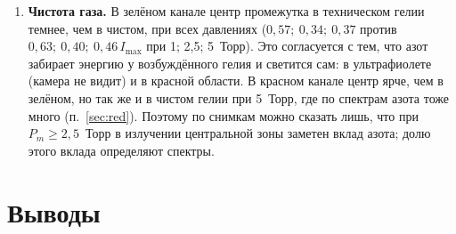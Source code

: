 \documentclass[12pt,a4paper]{article}
\begin{document}
\begin{enumerate}
        (азот, пары воды, см. полосу OH) сдвигают границу в сторону
        молекулярных газов. Это согласуется с тем, что в техническом
        гелии переход наступил раньше (3,5 против 3,9~Торр). Кроме того,
        появление страты --- лишь визуальный признак, и его точная
        связь с $\alpha\to\gamma$ требует измерения тока.
  \item \textbf{Чистота газа.} В зелёном канале центр промежутка в
        техническом гелии темнее, чем в чистом, при всех давлениях
        ($0{,}57;\ 0{,}34;\ 0{,}37$ против $0{,}63;\ 0{,}40;\ 0{,}46\,I_\text{max}$
        при 1; 2,5; 5~Торр). Это согласуется с тем, что азот забирает
        энергию у возбуждённого гелия и светится сам: в ультрафиолете
        (камера не видит) и в красной области. В красном канале центр
        ярче, чем в зелёном, но так же и в чистом гелии при 5~Торр, где по
        спектрам азота тоже много (п.~\ref{sec:red}). Поэтому по снимкам
        можно сказать лишь, что при $P_m \ge 2{,}5$~Торр в излучении
        центральной зоны заметен вклад азота; долю этого вклада определяют
        спектры.
\end{enumerate}

\section{Выводы}
\end{document}
